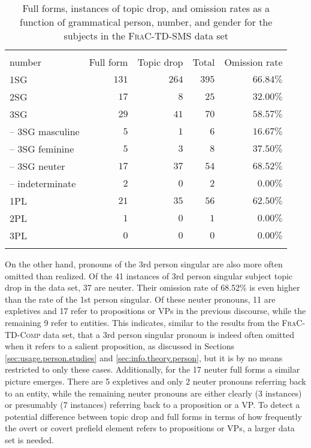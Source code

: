 \begin{table}
\caption{Full forms, instances of topic drop, and omission rates as a function of grammatical person, number, and gender for the subjects in the \textsc{FraC-TD-SMS} data set}
\centering
\begin{tabular}{lrrrr}
\lsptoprule
\Centerstack[c]{Grammatical person,\\number} & \multicolumn{1}{c}{\multirow{-1}{*}{Full form}}  & \multicolumn{1}{c}{\multirow{-1}{*}{Topic drop}} & \multicolumn{1}{c}{\multirow{-1}{*}{Total}} & \multicolumn{1}{c}{\multirow{-1}{*}{Omission rate}} \\
\midrule
1SG & $131$ & $264$ & $395$ & $66.84\%$ \\
2SG & $17$ & $8$ & $25$ & $32.00\%$ \\
3SG & $29$ & $41$ & $70$ & $58.57\%$ \\
-- 3SG masculine & $5$ & $1$ & $6$ & $16.67\%$\\
-- 3SG feminine & $5$ & $3$ & $8$ & $37.50\%$\\
-- 3SG neuter & $17$ & $37$ & $54$ & $68.52\%$\\
-- indeterminate & $2$ & $0$ & $2$ & $0.00\%$ \\
1PL & $21$ & $35$ & $56$ &  $62.50\%$ \\
2PL & $1$ & $0$ & $1$ & $0.00\%$ \\
3PL & $0$ & $0$ & $0$ & $0.00\%$ \\
\lspbottomrule
\end{tabular}
\label{tab:frac.gr.pers}
\end{table}

\noindent
On the other hand, pronouns of the 3rd person singular are also more often omitted than realized.
Of the 41 instances of 3rd person singular subject topic drop in the data set, 37 are neuter.
Their omission rate of 68.52\% is even higher than the rate of the 1st person singular.
Of these neuter pronouns, 11 are expletives  and 17 refer to propositions or VPs in the previous discourse, while the remaining 9 refer to entities.
This indicates, similar to the results from the \textsc{FraC-TD-Comp} data set, that a 3rd person singular pronoun is indeed often omitted when it refers to a salient  proposition, as discussed in Sections \ref{sec:usage.person.studies} and \ref{sec:info.theory.person}, but it is by no means restricted to only these cases.
Additionally, for the 17 neuter full forms a similar picture emerges.
There are 5 expletives  and only 2 neuter pronouns referring back to an entity, while the remaining neuter pronouns are either clearly (3 instances) or presumably (7 instances) referring back to a proposition or a VP.
To detect a potential difference between topic drop and full forms in terms of how frequently the overt or covert prefield element refers to propositions or VPs, a larger data set is needed. 

